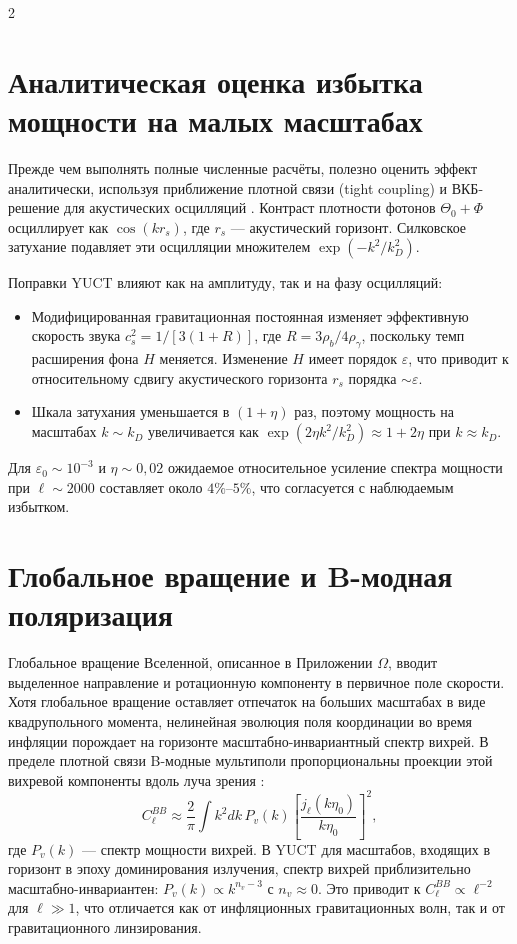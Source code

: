 \documentclass[11pt,a4paper]{article}
\begin{document}
\begin{multicols}{2}
		\section{Аналитическая оценка избытка мощности на малых масштабах}
		
		Прежде чем выполнять полные численные расчёты, полезно оценить эффект аналитически, используя приближение плотной связи (tight coupling) и ВКБ-решение для акустических осцилляций \cite{Hu1995}. Контраст плотности фотонов $\Theta_0 + \Phi$ осциллирует как $\cos(k r_s)$, где $r_s$ — акустический горизонт. Силковское затухание подавляет эти осцилляции множителем $\exp(-k^2/k_D^2)$.
		
		Поправки YUCT влияют как на амплитуду, так и на фазу осцилляций:
		\begin{itemize}
			\item Модифицированная гравитационная постоянная изменяет эффективную скорость звука $c_s^2 = 1/[3(1+R)]$, где $R = 3\rho_b/4\rho_\gamma$, поскольку темп расширения фона $H$ меняется. Изменение $H$ имеет порядок $\varepsilon$, что приводит к относительному сдвигу акустического горизонта $r_s$ порядка $\sim \varepsilon$.
			\item Шкала затухания уменьшается в $(1+\eta)$ раз, поэтому мощность на масштабах $k \sim k_D$ увеличивается как $\exp(2\eta k^2/k_D^2) \approx 1 + 2\eta$ при $k \approx k_D$.
		\end{itemize}
		Для $\varepsilon_0 \sim 10^{-3}$ и $\eta \sim 0,02$ ожидаемое относительное усиление спектра мощности при $\ell \sim 2000$ составляет около $4\%$--$5\%$, что согласуется с наблюдаемым избытком.
		
		\section{Глобальное вращение и B-модная поляризация}
		
		Глобальное вращение Вселенной, описанное в Приложении $\Omega$, вводит выделенное направление и ротационную компоненту в первичное поле скорости. Хотя глобальное вращение оставляет отпечаток на больших масштабах в виде квадрупольного момента, нелинейная эволюция поля координации во время инфляции порождает на горизонте масштабно-инвариантный спектр вихрей. В пределе плотной связи B-модные мультиполи пропорциональны проекции этой вихревой компоненты вдоль луча зрения \cite{Cooray2005}:
		\begin{equation}
			C_\ell^{BB} \approx \frac{2}{\pi} \int k^2 dk \, P_v(k) \left[ \frac{j_\ell(k\eta_0)}{k\eta_0} \right]^2,
		\end{equation}
		где $P_v(k)$ — спектр мощности вихрей. В YUCT для масштабов, входящих в горизонт в эпоху доминирования излучения, спектр вихрей приблизительно масштабно-инвариантен: $P_v(k) \propto k^{n_v-3}$ с $n_v \approx 0$. Это приводит к $C_\ell^{BB} \propto \ell^{-2}$ для $\ell \gg 1$, что отличается как от инфляционных гравитационных волн, так и от гравитационного линзирования.
		

\end{multicols}
\end{document}
